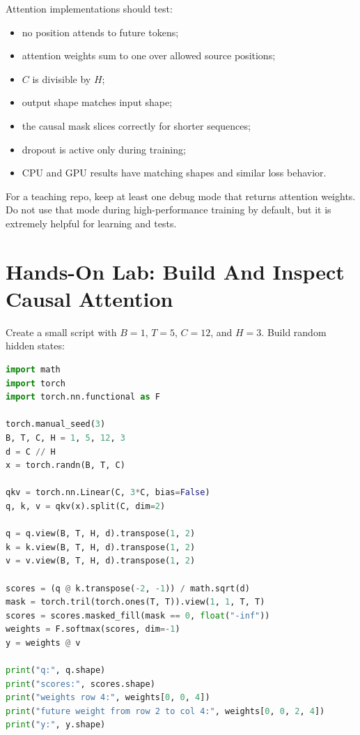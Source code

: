 Attention implementations should test:

\begin{itemize}
  \item no position attends to future tokens;
  \item attention weights sum to one over allowed source positions;
  \item \(C\) is divisible by \(H\);
  \item output shape matches input shape;
  \item the causal mask slices correctly for shorter sequences;
  \item dropout is active only during training;
  \item CPU and GPU results have matching shapes and similar loss behavior.
\end{itemize}

For a teaching repo, keep at least one debug mode that returns attention weights. Do not use that mode during high-performance training by default, but it is extremely helpful for learning and tests.

\section{Hands-On Lab: Build And Inspect Causal Attention}

Create a small script with \(B=1\), \(T=5\), \(C=12\), and \(H=3\). Build random hidden states:

\begin{lstlisting}[language=Python]
import math
import torch
import torch.nn.functional as F

torch.manual_seed(3)
B, T, C, H = 1, 5, 12, 3
d = C // H
x = torch.randn(B, T, C)

qkv = torch.nn.Linear(C, 3*C, bias=False)
q, k, v = qkv(x).split(C, dim=2)

q = q.view(B, T, H, d).transpose(1, 2)
k = k.view(B, T, H, d).transpose(1, 2)
v = v.view(B, T, H, d).transpose(1, 2)

scores = (q @ k.transpose(-2, -1)) / math.sqrt(d)
mask = torch.tril(torch.ones(T, T)).view(1, 1, T, T)
scores = scores.masked_fill(mask == 0, float("-inf"))
weights = F.softmax(scores, dim=-1)
y = weights @ v

print("q:", q.shape)
print("scores:", scores.shape)
print("weights row 4:", weights[0, 0, 4])
print("future weight from row 2 to col 4:", weights[0, 0, 2, 4])
print("y:", y.shape)
\end{lstlisting}

